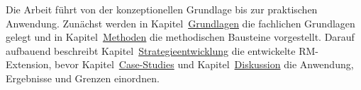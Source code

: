 Die Arbeit führt von der konzeptionellen Grundlage bis zur praktischen Anwendung.
Zunächst werden in Kapitel~\hyperref[sec:grundlagen]{Grundlagen} die fachlichen Grundlagen gelegt und in Kapitel~\hyperref[sec:methoden]{Methoden} die methodischen Bausteine vorgestellt.
Darauf aufbauend beschreibt Kapitel~\hyperref[sec:strategie]{Strategieentwicklung} die entwickelte RM-Extension, bevor Kapitel~\hyperref[sec:case_studies]{Case-Studies} und Kapitel~\hyperref[sec:diskussion]{Diskussion} die Anwendung, Ergebnisse und Grenzen einordnen.
